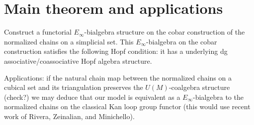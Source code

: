 \documentclass{amsart}
\begin{document}
\section{Main theorem and applications}

Construct a functorial $E_{\infty}$-bialgebra structure on the cobar construction of the normalized chains on a simplicial set. This $E_{\infty}$-bialgebra on the cobar construction satisfies the following Hopf condition: it has a underlying dg associative/coassociative Hopf algebra structure. 

Applications: if the natural chain map between the normalized chains on a cubical set and its triangulation preserves the $U(M)$-coalgebra structure (check?) we may deduce that our model is equivalent as a $E_{\infty}$-bialgebra to the normalized chains on the classical Kan loop group functor (this would use recent work of Rivera, Zeinalian, and Minichello). 


\end{document}
